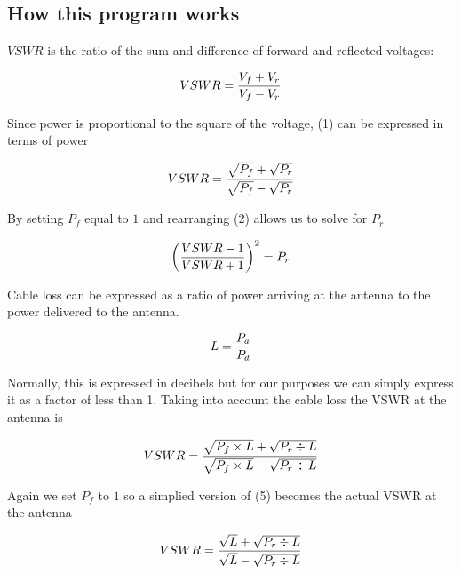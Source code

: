 	\subsection*{How this program works}

	$VSWR$ is the ratio of the sum and difference of forward and reflected voltages:

	\begin{equation}
		VSWR = {{V_f+V_r}\over{V_f-V_r}}
	\end{equation}

	Since power is proportional to the square of the voltage, (1) can be expressed in terms of power

	\begin{equation}
		VSWR = {{\sqrt{P_f}+\sqrt{P_r}}\over{\sqrt{P_f}-\sqrt{P_r}}}
	\end{equation}

	By setting $P_f$ equal to $1$ and rearranging (2) allows us to solve for  $P_r$

	\begin{equation}
		\left({{VSWR-1}\over{VSWR+1}}\right)^{2} = P_r
	\end{equation}

	Cable loss can be expressed as a ratio of power arriving at the antenna to the power delivered to the antenna.

	\begin{equation}
		L = {{P_a }\over{ P_d}}
	\end{equation}

	Normally, this is expressed in decibels but for our purposes we can simply express it as a factor of less than 1.
	Taking into account the cable loss the VSWR at the antenna is

	\begin{equation}
		VSWR = {{\sqrt{P_f \times L}+\sqrt{P_r \div L}}\over{\sqrt{P_f \times L}-\sqrt{P_r \div L}}}
	\end{equation}

	Again we set $P_f$ to $1$ so a simplied version of (5) becomes the actual VSWR at the antenna

	\begin{equation}
		VSWR = {{\sqrt{L}+\sqrt{P_r \div L}}\over{\sqrt{L}-\sqrt{P_r \div L}}}
	\end{equation}





